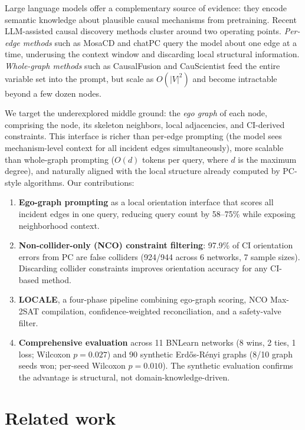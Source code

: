 \documentclass{article}
\begin{document}
Large language models offer a complementary source of evidence: they encode semantic knowledge about plausible causal mechanisms from pretraining. Recent LLM-assisted causal discovery methods cluster around two operating points. \textit{Per-edge methods} such as MosaCD \citep{chen2024mosacd} and chatPC \citep{ban2023chatpc} query the model about one edge at a time, underusing the context window and discarding local structural information. \textit{Whole-graph methods} such as CausalFusion \citep{takayama2024causalfusion} and CauScientist \citep{chen2025causcientist} feed the entire variable set into the prompt, but scale as $O(|V|^2)$ and become intractable beyond a few dozen nodes.

We target the underexplored middle ground: the \textit{ego graph} of each node, comprising the node, its skeleton neighbors, local adjacencies, and CI-derived constraints. This interface is richer than per-edge prompting (the model sees mechanism-level context for all incident edges simultaneously), more scalable than whole-graph prompting ($O(d)$ tokens per query, where $d$ is the maximum degree), and naturally aligned with the local structure already computed by PC-style algorithms. Our contributions:
\begin{enumerate}
    \item \textbf{Ego-graph prompting} as a local orientation interface that scores all incident edges in one query, reducing query count by 58--75\% while exposing neighborhood context.
    \item \textbf{Non-collider-only (NCO) constraint filtering}: 97.9\% of CI orientation errors from PC are false colliders (924/944 across 6 networks, 7 sample sizes). Discarding collider constraints improves orientation accuracy for any CI-based method.
    \item \textbf{LOCALE}, a four-phase pipeline combining ego-graph scoring, NCO Max-2SAT compilation, confidence-weighted reconciliation, and a safety-valve filter.
    \item \textbf{Comprehensive evaluation} across 11 BNLearn networks (8 wins, 2 ties, 1 loss; Wilcoxon $p{=}0.027$) and 90 synthetic Erd\H{o}s-R\'{e}nyi graphs (8/10 graph seeds won; per-seed Wilcoxon $p{=}0.010$). The synthetic evaluation confirms the advantage is structural, not domain-knowledge-driven.
\end{enumerate}

\section{Related work}
\end{document}
